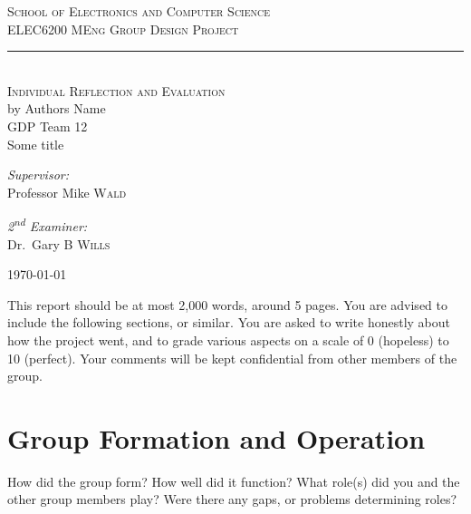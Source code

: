 \documentclass[a4paper,12pt]{article}
\newcommand{\HRule}{\rule{\linewidth}{0.5mm}}
\begin{document}
\begin{titlepage}
\begin{center}

\textsc{\Large School of Electronics and Computer Science}\\[0.2cm]
\textsc{\Large ELEC6200 MEng Group Design Project}\\[0.4cm]

\HRule \\[0.4cm]

\textsc{\Large Individual Reflection and Evaluation}\\[0.5cm]
by Authors Name\\[0.5cm]

GDP Team 12\\
Some title\\[0.5cm]

\noindent
\begin{minipage}{0.4\textwidth}
\begin{flushleft} \large
\emph{Supervisor:}\\
Professor Mike \textsc{Wald}
\end{flushleft}
\end{minipage}%
\begin{minipage}{0.4\textwidth}
\begin{flushright} \large
\emph{2\textsuperscript{nd} Examiner:} \\
Dr.~Gary B \textsc{Wills}
\end{flushright}
\end{minipage}

\vfill

{\large \today}

\end{center}
\end{titlepage}

This report should be at most 2,000 words, around 5 pages. You are advised to include the following sections, or similar. You are asked to write honestly about how the project went, and to grade various aspects on a scale of 0 (hopeless) to 10 (perfect). Your comments will be kept confidential from other members of the group.

\section{Group Formation and Operation}

How did the group form? How well did it function? What role(s) did you and the other group members play? Were there any gaps, or problems determining roles?
\end{document}
